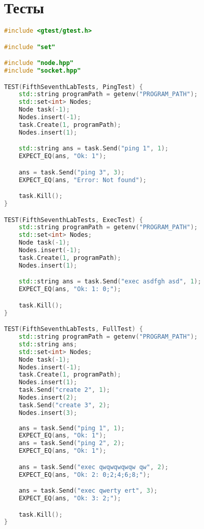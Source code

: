 \documentclass[a4paper, 12pt]{article}
\begin{document}
\newpage
\section{Тесты}
\begin{lstlisting}[language=C++]
#include <gtest/gtest.h>

#include "set"

#include "node.hpp"
#include "socket.hpp"

TEST(FifthSeventhLabTests, PingTest) {
    std::string programPath = getenv("PROGRAM_PATH");
    std::set<int> Nodes;
    Node task(-1);
    Nodes.insert(-1);
    task.Create(1, programPath);
    Nodes.insert(1);

    std::string ans = task.Send("ping 1", 1);
    EXPECT_EQ(ans, "Ok: 1");

    ans = task.Send("ping 3", 3);
    EXPECT_EQ(ans, "Error: Not found");

    task.Kill();
}

TEST(FifthSeventhLabTests, ExecTest) {
    std::string programPath = getenv("PROGRAM_PATH");
    std::set<int> Nodes;
    Node task(-1);
    Nodes.insert(-1);
    task.Create(1, programPath);
    Nodes.insert(1);

    std::string ans = task.Send("exec asdfgh asd", 1);
    EXPECT_EQ(ans, "Ok: 1: 0;");

    task.Kill();
}

TEST(FifthSeventhLabTests, FullTest) {
    std::string programPath = getenv("PROGRAM_PATH");
    std::string ans;
    std::set<int> Nodes;
    Node task(-1);
    Nodes.insert(-1);
    task.Create(1, programPath);
    Nodes.insert(1);
    task.Send("create 2", 1);
    Nodes.insert(2);
    task.Send("create 3", 2);
    Nodes.insert(3);
    
    ans = task.Send("ping 1", 1);
    EXPECT_EQ(ans, "Ok: 1");
    ans = task.Send("ping 2", 2);
    EXPECT_EQ(ans, "Ok: 1");

    ans = task.Send("exec qwqwqwqwqw qw", 2);
    EXPECT_EQ(ans, "Ok: 2: 0;2;4;6;8;");

    ans = task.Send("exec qwerty ert", 3);
    EXPECT_EQ(ans, "Ok: 3: 2;");

    task.Kill();
}

\end{lstlisting}

\newpage
\end{document}
